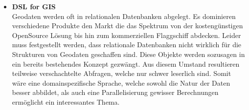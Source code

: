\documentclass{article}
\begin{document}
\begin{itemize}
	\item{\textbf{DSL for GIS} \\
	Geodaten werden oft in relationalen Datenbanken abgelegt. Es dominieren verschiedene Produkte den Markt die das Spektrum von der kostengünstigen OpenSource Lösung bis hin zum kommerziellen Flaggschiff abdecken. Leider muss festgestellt werden, dass relationale Datenbanken nicht wirklich für die Strukturen von Geodaten geschaffen sind. Diese Objekte werden sozusagen in ein bereits bestehendes Konzept gezwängt. Aus diesem Umstand resultieren teilweise verschachtelte Abfragen, welche nur schwer leserlich sind. Somit wäre eine domainspezifische Sprache, welche sowohl die Natur der Daten besser abbildet, als auch eine Parallelisierung gewisser Berechnungen ermöglicht ein interessantes Thema.
	}

\end{itemize}
\end{document}

